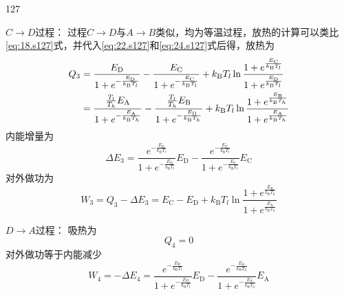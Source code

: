 \begin{solution}{127}
\begin{subsolution}
        $C \to D$过程：
        过程$C \to D$与$A \to B$类似，均为等温过程，放热的计算可以类比\eqref{eq:18.s127}式，并代入\eqref{eq:22.s127}和\eqref{eq:24.s127}式后得，放热为
        \begin{align}
            Q _ {3} &= \frac {E _ {\mathrm{D}}}{1 + e ^ {- \frac {E _ {\mathrm{D}}}{k _ {\mathrm{B}} T _ {l}}}} - \frac {E _ {\mathrm{C}}}{1 + e ^ {- \frac {E _ {\mathrm{C}}}{k _ {\mathrm{B}} T _ {l}}}} + k _ {\mathrm{B}} T _ {l} \ln \frac {1 + e ^ {\frac {E _ {\mathrm{C}}}{k _ {\mathrm{B}} T _ {l}}}}{1 + e ^ {\frac {E _ {\mathrm{D}}}{k _ {\mathrm{B}} T _ {l}}}} \notag \\
            &= \frac {\frac {T _ {l}}{T _ {h}} E _ {\mathrm{A}}}{1 + e ^ {- \frac {E _ {\mathrm{A}}}{k _ {\mathrm{B}} T _ {h}}}} - \frac {\frac {T _ {l}}{T _ {h}} E _ {\mathrm{B}}}{1 + e ^ {- \frac {E _ {\mathrm{B}}}{k _ {\mathrm{B}} T _ {h}}}} + k _ {\mathrm{B}} T _ {l} \ln \frac {1 + e ^ {\frac {E _ {\mathrm{B}}}{k _ {\mathrm{B}} T _ {h}}}}{1 + e ^ {\frac {E _ {\mathrm{A}}}{k _ {\mathrm{B}} T _ {h}}}}
            \label{eq:27.s127}
        \end{align}
        内能增量为
        \begin{equation}
            \Delta E _ {3} = \frac {e ^ {- \frac {E _ {\mathrm{D}}}{k _ {\mathrm{B}} T _ {l}}}}{1 + e ^ {- \frac {E _ {\mathrm{D}}}{k _ {\mathrm{B}} T _ {l}}}} E _ {\mathrm{D}} - \frac {e ^ {- \frac {E _ {\mathrm{C}}}{k _ {\mathrm{B}} T _ {l}}}}{1 + e ^ {- \frac {E _ {\mathrm{C}}}{k _ {\mathrm{B}} T _ {l}}}} E _ {\mathrm{C}}
            \label{eq:28.s127}
        \end{equation}
        对外做功为
        \begin{equation}
            W _ {3} = Q _ {3} - \Delta E _ {3} = E _ {\mathrm{C}} - E _ {\mathrm{D}} + k _ {\mathrm{B}} T _ {l} \ln \frac {1 + e ^ {\frac {E _ {\mathrm{B}}}{k _ {\mathrm{B}} T _ {h}}}}{1 + e ^ {\frac {E _ {\mathrm{A}}}{k _ {\mathrm{B}} T _ {h}}}}
            \label{eq:29.s127}
        \end{equation}

        $D \to A$过程：
        吸热为
        \begin{equation}
            Q _ {4} = 0
            \label{eq:30.s127}
        \end{equation}
        对外做功等于内能减少
        \begin{equation}
            W _ {4} = - \Delta E _ {4} = \frac {e ^ {- \frac {E _ {\mathrm{D}}}{k _ {\mathrm{B}} T _ {l}}}}{1 + e ^ {- \frac {E _ {\mathrm{D}}}{k _ {\mathrm{B}} T _ {l}}}} E _ {\mathrm{D}} - \frac {e ^ {- \frac {E _ {\mathrm{A}}}{k _ {\mathrm{B}} T _ {h}}}}{1 + e ^ {- \frac {E _ {\mathrm{A}}}{k _ {\mathrm{B}} T _ {h}}}} E _ {\mathrm{A}}
            \label{eq:31.s127}
        \end{equation}


\end{subsolution}
\end{solution}
